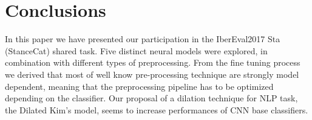 \section{Conclusions} \label{sec:conclusion}

In this paper we have presented our participation in the IberEval2017 Sta (StanceCat) shared task. Five distinct neural models were explored, in combination with different types of preprocessing.
From the fine tuning process we derived that most of well know pre-processing technique are strongly model dependent, meaning that the preprocessing pipeline has to be optimized depending on the classifier.
Our proposal of a dilation technique for NLP task, the Dilated Kim's model, seems to increase performances of CNN base classifiers.
